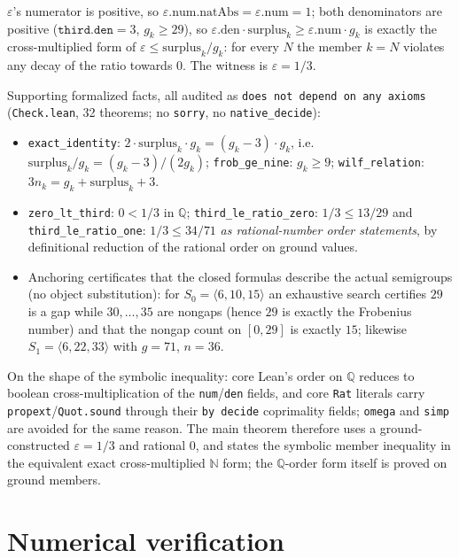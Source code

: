 \documentclass[11pt]{article}
\theoremstyle{definition}
\begin{document}
$\varepsilon$'s numerator is positive, so $\varepsilon.\mathrm{num.natAbs} =
\varepsilon.\mathrm{num} = 1$; both denominators are positive
($\texttt{third.den}=3$, $g_k\ge 29$), so
$\varepsilon.\mathrm{den}\cdot\mathrm{surplus}_k \ge
\varepsilon.\mathrm{num}\cdot g_k$ is exactly the cross-multiplied form of
$\varepsilon \le \mathrm{surplus}_k/g_k$: for every $N$ the member $k=N$
violates any decay of the ratio towards $0$. The witness is
$\varepsilon = 1/3$.

Supporting formalized facts, all audited as \texttt{does not depend on any
axioms} (\texttt{Check.lean}, 32 theorems; no \texttt{sorry}, no
\texttt{native\_decide}):

\begin{itemize}
\item \texttt{exact\_identity}: $2\cdot\mathrm{surplus}_k\cdot g_k = (g_k-3)\cdot g_k$,
i.e.\ $\mathrm{surplus}_k/g_k = (g_k-3)/(2g_k)$; \texttt{frob\_ge\_nine}: $g_k\ge 9$;
\texttt{wilf\_relation}: $3n_k = g_k + \mathrm{surplus}_k + 3$.
\item \texttt{zero\_lt\_third}: $0 < 1/3$ in $\mathbb{Q}$;
\texttt{third\_le\_ratio\_zero}: $1/3 \le 13/29$ and
\texttt{third\_le\_ratio\_one}: $1/3 \le 34/71$ \emph{as rational-number order
statements}, by definitional reduction of the rational order on ground values.
\item Anchoring certificates that the closed formulas describe the actual
semigroups (no object substitution): for $S_0=\langle 6,10,15\rangle$ an
exhaustive search certifies $29$ is a gap while $30,\dots,35$ are nongaps
(hence $29$ is exactly the Frobenius number) and that the nongap count on
$[0,29]$ is exactly $15$; likewise $S_1=\langle 6,22,33\rangle$ with $g=71$,
$n=36$.
\end{itemize}

On the shape of the symbolic inequality: core Lean's order on $\mathbb{Q}$
reduces to boolean cross-multiplication of the \texttt{num}/\texttt{den} fields,
and core \texttt{Rat} literals carry \texttt{propext}/\texttt{Quot.sound}
through their \texttt{by decide} coprimality fields; \texttt{omega} and
\texttt{simp} are avoided for the same reason. The main theorem therefore uses a
ground-constructed $\varepsilon=1/3$ and rational $0$, and states the symbolic
member inequality in the equivalent exact cross-multiplied $\mathbb{N}$ form;
the $\mathbb{Q}$-order form itself is proved on ground members.

\section{Numerical verification}
\end{document}
